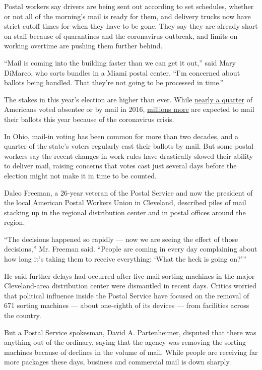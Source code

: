 Postal workers say drivers are being sent out according to set
schedules, whether or not all of the morning's mail is ready for them,
and delivery trucks now have strict cutoff times for when they have to
be gone. They say they are already short on staff because of quarantines
and the coronavirus outbreak, and limits on working overtime are pushing
them further behind.

``Mail is coming into the building faster than we can get it out,'' said
Mary DiMarco, who sorts bundles in a Miami postal center. ``I'm
concerned about ballots being handled. That they're not going to be
processed in time.''

The stakes in this year's election are higher than ever. While
\href{https://www.eac.gov/documents/2017/10/17/eavs-deep-dive-early-absentee-and-mail-voting-data-statutory-overview}{nearly
a quarter} of Americans voted absentee or by mail in 2016,
\href{https://www.nytimes3xbfgragh.onion/interactive/2020/08/11/us/politics/vote-by-mail-us-states.html}{millions
more} are expected to mail their ballots this year because of the
coronavirus crisis.

In Ohio, mail-in voting has been common for more than two decades, and a
quarter of the state's voters regularly cast their ballots by mail. But
some postal workers say the recent changes in work rules have
drastically slowed their ability to deliver mail, raising concerns that
votes cast just several days before the election might not make it in
time to be counted.

Daleo Freeman, a 26-year veteran of the Postal Service and now the
president of the local American Postal Workers Union in Cleveland,
described piles of mail stacking up in the regional distribution center
and in postal offices around the region.

``The decisions happened so rapidly --- now we are seeing the effect of
those decisions,'' Mr. Freeman said. ``People are coming in every day
complaining about how long it's taking them to receive everything: `What
the heck is going on?'''

He said further delays had occurred after five mail-sorting machines in
the major Cleveland-area distribution center were dismantled in recent
days. Critics worried that political influence inside the Postal Service
have focused on the removal of 671 sorting machines --- about one-eighth
of its devices --- from facilities across the country.

But a Postal Service spokesman, David A. Partenheimer, disputed that
there was anything out of the ordinary, saying that the agency was
removing the sorting machines because of declines in the volume of mail.
While people are receiving far more packages these days, business and
commercial mail is down sharply.

